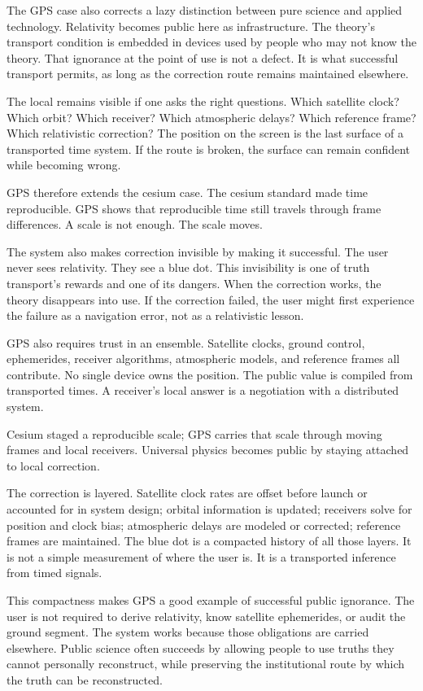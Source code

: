 The GPS case also corrects a lazy distinction between pure science and
applied technology. Relativity becomes public here as infrastructure.
The theory's transport condition is embedded in devices used by people
who may not know the theory. That ignorance at the point of use is not a
defect. It is what successful transport permits, as long as the
correction route remains maintained elsewhere.

The local remains visible if one asks the right questions. Which
satellite clock? Which orbit? Which receiver? Which atmospheric delays?
Which reference frame? Which relativistic correction? The position on
the screen is the last surface of a transported time system. If the
route is broken, the surface can remain confident while becoming wrong.

GPS therefore extends the cesium case. The cesium standard made time
reproducible. GPS shows that reproducible time still travels through
frame differences. A scale is not enough. The scale moves.

The system also makes correction invisible by making it successful. The
user never sees relativity. They see a blue dot. This invisibility is one
of truth transport's rewards and one of its dangers. When the correction
works, the theory disappears into use. If the correction failed, the user
might first experience the failure as a navigation error, not as a
relativistic lesson.

GPS also requires trust in an ensemble. Satellite clocks, ground
control, ephemerides, receiver algorithms, atmospheric models, and
reference frames all contribute. No single device owns the position. The
public value is compiled from transported times. A receiver's local
answer is a negotiation with a distributed system.

Cesium staged a reproducible scale; GPS carries that scale through moving
frames and local receivers. Universal physics becomes public by staying
attached to local correction.

The correction is layered. Satellite clock rates are offset before
launch or accounted for in system design; orbital information is
updated; receivers solve for position and clock bias; atmospheric delays
are modeled or corrected; reference frames are maintained. The blue dot
is a compacted history of all those layers. It is not a simple
measurement of where the user is. It is a transported inference from
timed signals.

This compactness makes GPS a good example of successful public
ignorance. The user is not required to derive relativity, know satellite
ephemerides, or audit the ground segment. The system works because those
obligations are carried elsewhere. Public science often succeeds by
allowing people to use truths they cannot personally reconstruct, while
preserving the institutional route by which the truth can be
reconstructed.

